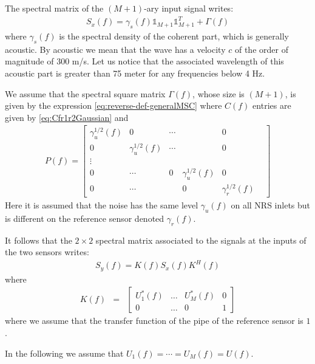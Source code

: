 
The spectral matrix of the $(M+1)$-ary input signal writes:
\begin{eqnarray}
\label{eq:Sxf}
 S_x(f) = \gamma_{s}(f) \mathds{1}_{M+1}\mathds{1}_{M+1}^T+ \Gamma(f)
\end{eqnarray}
where $\gamma_{s}(f)$ is the spectral density of the coherent part, which is generally acoustic. By acoustic we mean that the wave has a velocity $c$ of the order of magnitude of $300$ m/s. Let us notice that the associated wavelength of this acoustic part is greater  than 75 meter for any frequencies below 4 Hz.

We assume that the spectral square matrix $\Gamma(f)$, whose size is $(M+1)$, is given by the expression \eqref{eq:reverse-def-generalMSC}  where $C(f)$ entries are given by \eqref{eq:Cfr1r2Gaussian} and 
\begin{eqnarray}
  \label{eq:spectral-content}
 P(f) =   \begin{bmatrix}
  \gamma_{u}^{1/2}(f)&0&\cdots&&0&
  \\
  0&\gamma_{u}^{1/2}(f)&\cdots&&0&
  \\
  \vdots
  \\
  0&\cdots&0&\gamma_{u}^{1/2}(f)&0
  \\
  0&\cdots&&0&\gamma_{r}^{1/2}(f)
  \end{bmatrix}
\end{eqnarray}
Here it is assumed that the noise has the same level $\gamma_{u}(f)$ on all NRS inlets but is different on the reference sensor denoted $\gamma_{r}(f)$.

It follows that the $2\times 2$ spectral matrix associated to the signals at the inputs of the two sensors writes:
\begin{eqnarray}
\label{eq:Syf}
 S_y(f) = K(f) S_x(f) K^H(f)
 \end{eqnarray}
where
\begin{eqnarray*}
K(f)&=&
\begin{bmatrix}
U_{1}^*(f)&\ldots&U_{M}^*(f)&0
\\
0&\ldots&0&1
\end{bmatrix}
\end{eqnarray*}
where we assume that the transfer function of the pipe of the reference sensor is $1$. 

In the following we assume that $U_{1}(f)=\cdots= U_{M}(f)=U(f)$.

